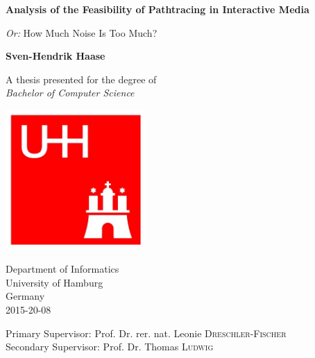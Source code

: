 \begin{titlepage}
    \begin{center}
        \Huge
        \textbf{Analysis of the Feasibility of Pathtracing in Interactive Media}
        
        \vspace{0.5cm}

        \LARGE
        \textit{Or:} How Much Noise Is Too Much?
        
        \vspace{1.5cm}
        
        \textbf{Sven-Hendrik Haase}
        
        \vfill
        
        A thesis presented for the degree of\\
        \emph{Bachelor of Computer Science}
        
        \vspace{0.8cm}
        
        \includegraphics[width=0.4\textwidth]{frontbackmatter/logo_uhh.jpg}
        
        
        \Large
        Department of Informatics\\
        University of Hamburg\\
        Germany\\
        2015-20-08

        \vspace{0.8cm}

        \large
        Primary Supervisor: Prof. Dr. rer. nat. Leonie \textsc{Dreschler-Fischer}\\
        Secondary Supervisor: Prof. Dr. Thomas \textsc{Ludwig}
        
    \end{center}
\end{titlepage}
